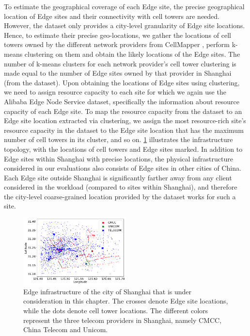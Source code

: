 To estimate the geographical coverage of each Edge site, the precise geographical location of Edge sites and their connectivity with cell towers are needed. However, the dataset only provides a city-level granularity of Edge site locations. Hence, to estimate their precise geo-locations, we gather the locations of cell towers owned by the different network providers from CellMapper \cite{cellmapper}, perform k-means clustering on them and obtain the likely locations of the Edge sites. The number of k-means clusters for each network provider's cell tower clustering is made equal to the number of Edge sites owned by that provider in Shanghai (from the dataset). Upon obtaining the locations of Edge sites using clustering, we need to assign resource capacity to each site for which we again use the Alibaba Edge Node Service dataset, specifically the information about resource capacity of each Edge site. To map the resource capacity from the dataset to an Edge site location extracted via clustering, we assign the most resource-rich site's resource capacity in the dataset to the Edge site location that has the maximum number of cell towers in its cluster, and so on. \cref{fig:shanghai_infra} illustrates the infrastructure topology, with the locations of cell towers and Edge sites marked. In addition to Edge sites within Shanghai with precise locations, the physical infrastructure considered in our evaluations also consists of Edge sites in other cities of China. Each Edge site outside Shanghai is significantly farther away from any client considered in the workload (compared to sites within Shanghai), and therefore the city-level coarse-grained location provided by the dataset works for such a site.
\begin{figure}
\centering
\includegraphics[width=0.5\textwidth]{figures/mechanisms/infrastructure.png}
\caption{Edge infrastructure of the city of Shanghai that is under consideration in this chapter. The crosses denote Edge site locations, while the dots denote cell tower locations. The different colors represent the three telecom providers in Shanghai, namely CMCC, China Telecom and Unicom.}
\label{fig:shanghai_infra}
\end{figure}

